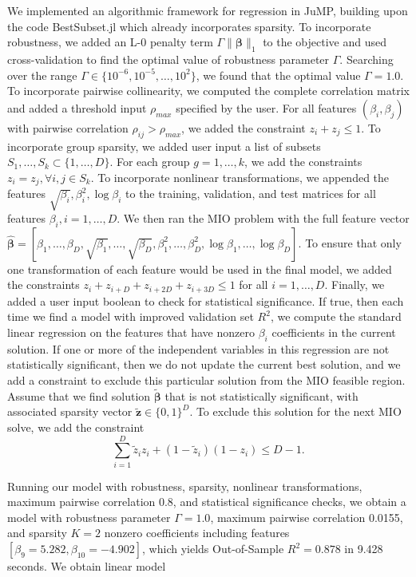 \documentclass[12pt]{article}
\newcommand{\M}{\mathbf}
\newcommand{\MS}{\boldsymbol}
\newcommand{\1}{\mathds{1}}
\begin{document}
We implemented an algorithmic framework for regression in JuMP, building upon the code BestSubset.jl which already incorporates sparsity.  To incorporate robustness, we added an L-0 penalty term $\Gamma \|\MS \beta\|_1$ to the objective and used cross-validation to find the optimal value of robustness parameter $\Gamma$. Searching over the range $\Gamma \in \{10^{-6},10^{-5},\ldots,10^2\}$, we found that the optimal value $\Gamma = 1.0$.  To incorporate pairwise collinearity, we computed the complete correlation matrix and added a threshold input $\rho_{max}$ specified by the user.  For all features $(\beta_i, \beta_j)$ with pairwise correlation $\rho_{ij} > \rho_{max}$, we added the constraint $z_i + z_j \le 1$.  To incorporate group sparsity, we added user input a list of subsets $S_1,\ldots, S_k \subset \{1,\ldots, D\}$.  For each group $g = 1,\ldots,k$, we add the constraints $z_i = z_j, \forall i,j \in S_k$.  To incorporate nonlinear transformations, we appended the features $\sqrt{\beta_i}, \beta_i^2, \log \beta_i$ to the training, validation, and test matrices for all features $\beta_i, i=1,\ldots,D$.  We then ran the MIO problem with the full feature vector $\hat{\MS \beta} = [\beta_1,\ldots, \beta_D, \sqrt{\beta_1}, \ldots, \sqrt{\beta_D}, \beta_1^2, \ldots, \beta_D^2, \log \beta_1, \ldots, \log \beta_D]$.   To ensure that only one transformation of each feature would be used in the final model, we added the constraints $z_i + z_{i+D} + z_{i+2D} + z_{i+3D} \le 1$ for all $i = 1,\ldots,D$.    Finally, we added a user input boolean to check for statistical significance.  If true, then each time we find a model with improved validation set $R^2$, we compute the standard linear regression on the features that have nonzero $\beta_i$ coefficients in the current solution.  If one or more of the independent variables in this regression are not statistically significant, then we do not update the current best solution, and we add a constraint to exclude this particular solution from the MIO feasible region.  Assume that we find solution $\MS {\tilde \beta}$ that is not statistically significant, with associated sparsity vector $\M {\tilde z} \in \{0,1\}^D$.  To exclude this solution for the next MIO solve, we add the constraint
\[
\sum_{i=1}^D {\tilde z_i} z_i + (1 - {\tilde z_i})(1 - z_i) \le D - 1.
\]

Running our model with robustness, sparsity, nonlinear transformations, maximum pairwise correlation 0.8, and statistical significance checks, we obtain a model with robustness parameter $\Gamma = 1.0$, maximum pairwise correlation 0.0155, and sparsity $K = 2$ nonzero coefficients including features $[\beta_{9}=5.282, \beta_{10}=-4.902]$, which yields Out-of-Sample $R^2 = 0.878$ in 9.428 seconds.  We obtain linear model
\end{document}

